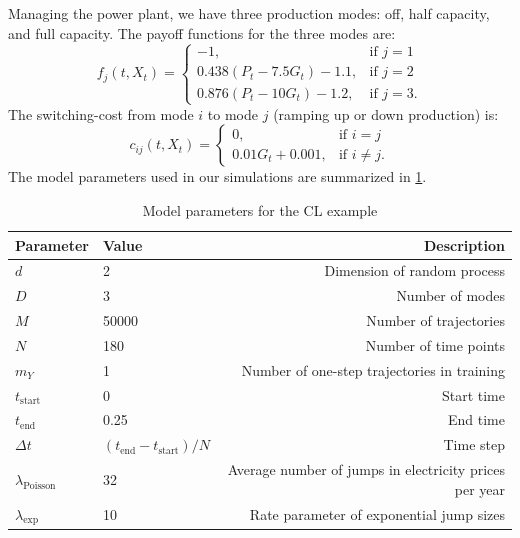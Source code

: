\documentclass[11pt,reqno,a4paper]{amsart}
\theoremstyle{definition}
\numberwithin{equation}{section}
\DeclareMathOperator{\1}{\mathbbm{1}}
\begin{document}
Managing the power plant, we have three production modes: off, half capacity, and full capacity. The payoff functions for the three modes are:
\begin{equation}
  f_j(t,X_t) = \begin{cases}
    -1,                        & \text{if } j = 1  \\
    0.438(P_t - 7.5G_t) - 1.1, & \text{if } j = 2  \\
    0.876(P_t - 10G_t) - 1.2,  & \text{if } j = 3.
  \end{cases}
\end{equation}
The switching-cost from mode $i$ to mode $j$ (ramping up or down production) is:
\begin{equation}
  c_{ij}(t,X_t) = \begin{cases}
    0,               & \text{if } i = j     \\
    0.01G_t + 0.001, & \text{if } i \neq j.
  \end{cases}
\end{equation}
The model parameters used in our simulations are summarized in \cref{table:carmona}.
\begin{table}[ht]
  \caption{Model parameters for the CL example}
  \label{table:carmona}
  \centering
  \begin{tabular}{@{}llr@{}}
    \toprule
    Parameter                & Value                               & Description                                            \\
    \midrule
    $d$                      & 2                                   & Dimension of random process                            \\
    $D$                      & 3                                   & Number of modes                                        \\
    $M$                      & 50000                               & Number of trajectories                                 \\
    $N$                      & 180                                 & Number of time points                                  \\
    $m_Y$                    & 1                                   & Number of one-step trajectories in training            \\
    $t_\text{start}$         & 0                                   & Start time                                             \\
    $t_\text{end}$           & 0.25                                & End time                                               \\
    $\Delta t$               & $(t_\text{end} - t_\text{start})/N$ & Time step                                              \\
    $\lambda_\text{Poisson}$ & 32                                  & Average number of jumps in electricity prices per year \\
    $\lambda_\text{exp}$     & 10                                  & Rate parameter of exponential jump sizes               \\
    \bottomrule
  \end{tabular}
\end{table}
\end{document}
